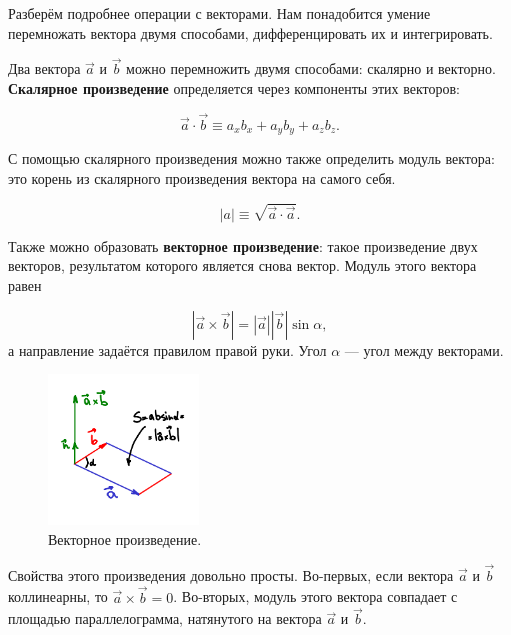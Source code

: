\documentclass[12pt,a4paper]{article}
\numberwithin{equation}{section}
\numberwithin{equation}{section}
\begin{document}
Разберём подробнее операции с векторами. Нам понадобится умение
перемножать вектора двумя способами, дифференцировать их и
интегрировать. 

Два вектора $\vec{a}$ и $\vec{b}$ можно перемножить двумя способами:
скалярно и векторно. \textbf{Скалярное произведение} определяется через
компоненты этих векторов:

\begin{equation}
  \label{eq:def_scalar_product}
  \vec{a} \cdot \vec{b} \equiv a_x b_x + a_y b_y + a_z b_z.
\end{equation}

С помощью скалярного произведения можно также определить модуль
вектора: это корень из скалярного произведения вектора на самого себя.

\begin{equation}
  \label{eq:def_modulus_vector}
  |a| \equiv \sqrt{\vec{a} \cdot \vec{a}}.
\end{equation}

Также можно образовать \textbf{векторное произведение}: такое
произведение двух векторов, результатом которого является снова
вектор. Модуль этого вектора равен

\begin{equation}
  \label{eq:def_cross_product}
  | \vec{a} \times \vec{b}| = |\vec{a}| |\vec{b}| \sin \alpha,  
\end{equation}
а направление задаётся правилом правой руки. Угол $\alpha$ --- угол
между векторами. 

\begin{figure}
  \vspace{-1.5cm}
  \begin{center}
    \includegraphics[width=4cm,height=4cm]{cross.pdf}
  \end{center}
  \vspace{-0.7cm}
  \caption{Векторное произведение.}
  \label{fig:curl}
  \vspace{-1cm}
\end{figure}

Свойства этого произведения довольно просты. Во-первых, если вектора
$\vec{a}$ и $\vec{b}$ коллинеарны, то $\vec{a} \times
\vec{b}=0$. Во-вторых, модуль этого вектора совпадает с площадью
параллелограмма, натянутого на вектора $\vec{a}$ и $\vec{b}$.
\end{document}
